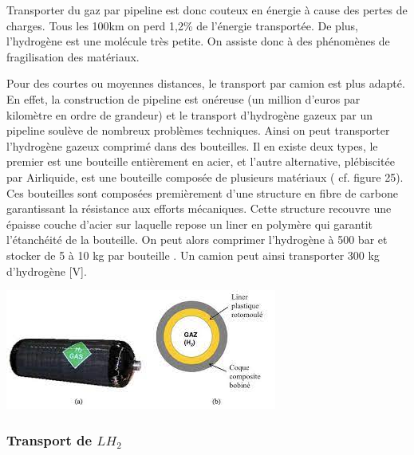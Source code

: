 \documentclass[11pt,french,a4paper]{article}
\begin{document}
\begin{multicols}{2}

Transporter du gaz par pipeline est donc couteux en énergie à cause des pertes de charges. Tous les 100km on perd 1,2\% de l'énergie transportée. De plus, l'hydrogène est une molécule très petite. On assiste donc à des phénomènes de fragilisation des matériaux.

Pour des courtes ou moyennes distances, le transport par camion est plus adapté. En effet, la construction de pipeline est onéreuse (un million d’euros par kilomètre en ordre de grandeur) et le transport d’hydrogène gazeux par un pipeline soulève de nombreux problèmes techniques. Ainsi on peut transporter l’hydrogène gazeux comprimé dans des bouteilles. Il en existe deux types, le premier est une bouteille entièrement en acier, et l’autre alternative, plébiscitée par Airliquide, est une bouteille composée de plusieurs matériaux ( cf. figure 25). Ces bouteilles sont composées premièrement d’une structure en fibre de carbone garantissant la résistance aux efforts mécaniques. Cette structure recouvre une épaisse couche d’acier sur laquelle repose un liner en polymère qui garantit l’étanchéité de la bouteille. On peut alors comprimer l’hydrogène à 500 bar et stocker de 5 à 10 kg par bouteille \cite{MAHYTEC}. Un camion peut ainsi transporter 300 kg d’hydrogène [V].

\begin{center}
\includegraphics[width=.8\linewidth]{image/chap3/Figure 3.i-1.png}
\end{center}

\end{multicols}

\subsubsection{Transport de $LH_2$}
\end{document}
